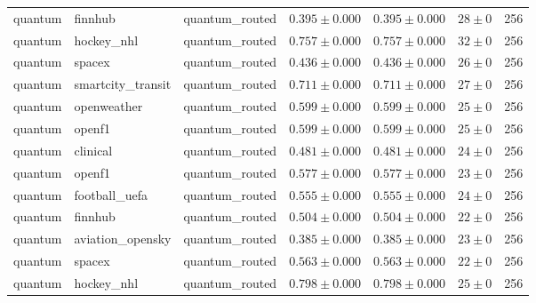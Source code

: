 \begin{table}[htbp]
\begin{tabular}{l l l r r r r}
quantum & finnhub & quantum\_routed & $0.395\pm0.000$ & $0.395\pm0.000$ & $28\pm0$ & 256 \\
quantum & hockey\_nhl & quantum\_routed & $0.757\pm0.000$ & $0.757\pm0.000$ & $32\pm0$ & 256 \\
quantum & spacex & quantum\_routed & $0.436\pm0.000$ & $0.436\pm0.000$ & $26\pm0$ & 256 \\
quantum & smartcity\_transit & quantum\_routed & $0.711\pm0.000$ & $0.711\pm0.000$ & $27\pm0$ & 256 \\
quantum & openweather & quantum\_routed & $0.599\pm0.000$ & $0.599\pm0.000$ & $25\pm0$ & 256 \\
quantum & openf1 & quantum\_routed & $0.599\pm0.000$ & $0.599\pm0.000$ & $25\pm0$ & 256 \\
quantum & clinical & quantum\_routed & $0.481\pm0.000$ & $0.481\pm0.000$ & $24\pm0$ & 256 \\
quantum & openf1 & quantum\_routed & $0.577\pm0.000$ & $0.577\pm0.000$ & $23\pm0$ & 256 \\
quantum & football\_uefa & quantum\_routed & $0.555\pm0.000$ & $0.555\pm0.000$ & $24\pm0$ & 256 \\
quantum & finnhub & quantum\_routed & $0.504\pm0.000$ & $0.504\pm0.000$ & $22\pm0$ & 256 \\
quantum & aviation\_opensky & quantum\_routed & $0.385\pm0.000$ & $0.385\pm0.000$ & $23\pm0$ & 256 \\
quantum & spacex & quantum\_routed & $0.563\pm0.000$ & $0.563\pm0.000$ & $22\pm0$ & 256 \\
quantum & hockey\_nhl & quantum\_routed & $0.798\pm0.000$ & $0.798\pm0.000$ & $25\pm0$ & 256 \\
\hline
\end{tabular}
\end{table}
